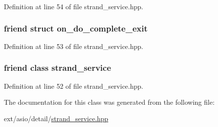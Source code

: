 Definition at line 54 of file strand\+\_\+service.\+hpp.

\hypertarget{classasio_1_1detail_1_1strand__service_1_1strand__impl_ae2c4b404800934e49953061db0c7cbb3}{}
\subsubsection[{on\+\_\+do\+\_\+complete\+\_\+exit}]{\setlength{\rightskip}{0pt plus 5cm}friend struct {\bf on\+\_\+do\+\_\+complete\+\_\+exit}\hspace{0.3cm}{\ttfamily [friend]}}\label{classasio_1_1detail_1_1strand__service_1_1strand__impl_ae2c4b404800934e49953061db0c7cbb3}


Definition at line 53 of file strand\+\_\+service.\+hpp.

\hypertarget{classasio_1_1detail_1_1strand__service_1_1strand__impl_a1277f3ace68e6c0bc027b130c8885364}{}
\subsubsection[{strand\+\_\+service}]{\setlength{\rightskip}{0pt plus 5cm}friend class {\bf strand\+\_\+service}\hspace{0.3cm}{\ttfamily [friend]}}\label{classasio_1_1detail_1_1strand__service_1_1strand__impl_a1277f3ace68e6c0bc027b130c8885364}


Definition at line 52 of file strand\+\_\+service.\+hpp.



The documentation for this class was generated from the following file\+:\begin{DoxyCompactItemize}
\item 
ext/asio/detail/\hyperlink{strand__service_8hpp}{strand\+\_\+service.\+hpp}\end{DoxyCompactItemize}

